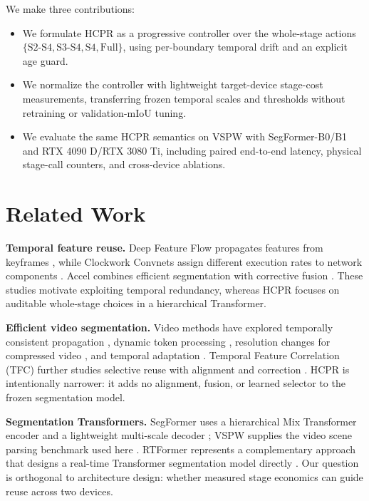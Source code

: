 \documentclass{article}
\begin{document}
We make three contributions:
\begin{itemize}
\item We formulate HCPR as a progressive controller over the whole-stage actions $\{\mathrm{S2\mbox{-}S4},\mathrm{S3\mbox{-}S4},\mathrm{S4},\mathrm{Full}\}$, using per-boundary temporal drift and an explicit age guard.
\item We normalize the controller with lightweight target-device stage-cost measurements, transferring frozen temporal scales and thresholds without retraining or validation-mIoU tuning.
\item We evaluate the same HCPR semantics on VSPW with SegFormer-B0/B1 and RTX 4090 D/RTX 3080 Ti, including paired end-to-end latency, physical stage-call counters, and cross-device ablations.
\end{itemize}

\section{Related Work}
\textbf{Temporal feature reuse.} Deep Feature Flow propagates features from keyframes \cite{zhu2017dff}, while Clockwork Convnets assign different execution rates to network components \cite{shelhamer2016clockwork}. Accel combines efficient segmentation with corrective fusion \cite{jain2019accel}. These studies motivate exploiting temporal redundancy, whereas HCPR focuses on auditable whole-stage choices in a hierarchical Transformer.

\textbf{Efficient video segmentation.} Video methods have explored temporally consistent propagation \cite{baghbaderani2024bofp}, dynamic token processing \cite{liu2024dovit}, resolution changes for compressed video \cite{hu2023arseg}, and temporal adaptation \cite{zhang2022auxadapt}. Temporal Feature Correlation (TFC) further studies selective reuse with alignment and correction \cite{lin2024tfc}. HCPR is intentionally narrower: it adds no alignment, fusion, or learned selector to the frozen segmentation model.

\textbf{Segmentation Transformers.} SegFormer uses a hierarchical Mix Transformer encoder and a lightweight multi-scale decoder \cite{xie2021segformer}; VSPW supplies the video scene parsing benchmark used here \cite{miao2021vspw}. RTFormer represents a complementary approach that designs a real-time Transformer segmentation model directly \cite{wang2022rtformer}. Our question is orthogonal to architecture design: whether measured stage economics can guide reuse across two devices.
\end{document}
